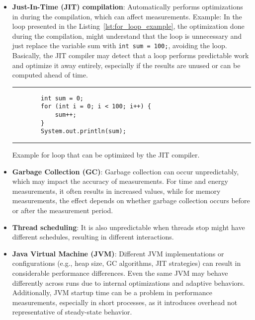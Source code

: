 \begin{itemize}
    \item \textbf{Just-In-Time (JIT) compilation}: Automatically performs optimizations in during the compilation, which can affect measurements. Example: In the loop presented in the Listing~\ref{lst:for_loop_example}, the optimization done during the compilation, might understand that the loop is unnecessary and just replace the variable sum with \texttt{int sum = 100;}, avoiding the loop. Basically, the JIT compiler may detect that a loop performs predictable work and optimize it away entirely, especially if the results are unused or can be computed ahead of time.
    
    \begin{listing}[H]
    \noindent\rule{\linewidth}{0.4pt}
    \begin{verbatim}
        int sum = 0;
        for (int i = 0; i < 100; i++) {
            sum++;
        }
        System.out.println(sum);
    \end{verbatim}
    \noindent\rule{\linewidth}{0.4pt}
    \caption{Example for loop that can be optimized by the JIT compiler.}            
    \label{lst:for_loop_example}
    \end{listing}

    
    \item \textbf{Garbage Collection (GC)}: Garbage collection can occur unpredictably, which may impact the accuracy of measurements. For time and energy measurements, it often results in increased values, while for memory measurements, the effect depends on whether garbage collection occurs before or after the measurement period.
    
    \item \textbf{Thread scheduling}: It is also unpredictable when threads stop might have different schedules, resulting in different interactions.
    
    \item \textbf{Java Virtual Machine (JVM)}: Different JVM implementations or configurations (e.g., heap size, GC algorithms, JIT strategies) can result in considerable performance differences. Even the same JVM may behave differently across runs due to internal optimizations and adaptive behaviors. Additionally, JVM startup time can be a problem in performance measurements, especially in short processes, as it introduces overhead not representative of steady-state behavior.

\end{itemize}

